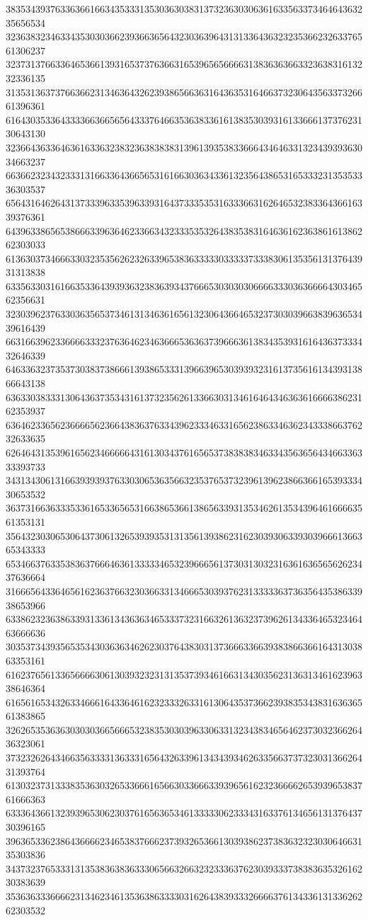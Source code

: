 38353439376336366166343533313530363038313732363030636163356337346464363235656534
32363832346334353030366239366365643230363964313133643632323536623263376561306237
32373137663364653661393165373763663165396565666631383636366332363831613232336135
31353136373766366231346364326239386566363164363531646637323064356337326661396361
61643035336433336636656564333764663536383361613835303931613366613737623130643130
32366436336463616336323832363838383139613935383366643464633132343939363034663237
66366232343233313166336436656531616630363433613235643865316533323135353336303537
65643164626431373339633539633931643733353531633366316264653238336436616339376361
64396338656538666339636462336634323335353264383538316463616236386161386262303033
61363037346663303235356262326339653836333330333337333830613535613137643931313838
63356330316166353364393936323836393437666530303030666633303636666430346562356631
32303962376330363565373461313463616561323064366465323730303966383963653439616439
66316639623366663332376364623463666536363739666361383435393161643637333432646339
64633632373537303837386661393865333139663965303939323161373561613439313866643138
63633038333130643637353431613732356261336630313461646434636361666638623162353937
63646233656236666562366438363763343962333463316562386334636234333866376232633635
62646431353961656234666664316130343761656537383838346334356365643466336333393733
34313430613166393939376330306536356632353765373239613962386636616539333430653532
36373166363335336165336565316638653661386563393135346261353439646166663561353131
35643230306530643730613265393935313135613938623162303930633930396661366365343333
65346637633538363766646361333334653239666561373031303231636163656562623437636664
31666564336465616236376632303663313466653039376231333336373635643538633938653966
63386232363863393133613436363465333732316632613632373962613433646532346463666636
30353734393565353430363634626230376438303137366633663938386636616431303863353161
61623765613365666630613039323231313537393461663134303562313631346162396338646364
61656165343263346661643364616232333263316130643537366239383534383163636561383865
32626535363630303036656665323835303039633063313234383465646237303236626436323061
37323262643466356333313633316564326339613434393462633566373732303136626431393764
61303237313338353630326533666165663033666339396561623236666265393965383761666363
63336436613239396530623037616563653461333330623334316337613465613137643730396165
39636533623864366662346538376662373932653661303938623738363232303064663135303836
34373237653331313538363836333065663266323233363762303933373838363532616230383639
35363633366662313462346135363863333031626438393332666637613433613133626262303532

